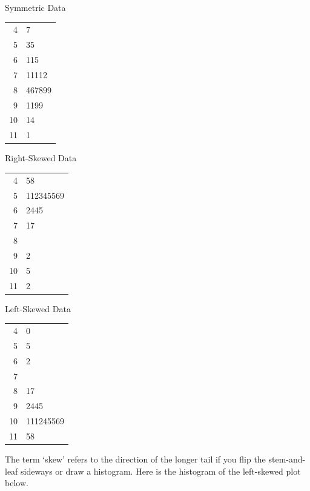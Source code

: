 \documentclass[11pt, chapterprefix=true]{scrbook}\usepackage[]{graphicx}\usepackage[]{color}
\begin{document}
\begin{minipage}[ht]{5cm}

Symmetric Data



\begin{tabular}{@{} r|l @{}} \hline
4 & 7 \\
5 & 35 \\
6 & 115 \\
7 & 11112 \\
8 & 467899 \\
9 & 1199 \\
10 & 14 \\
11 & 1 \\ \hline
\end{tabular}
\end{minipage}
\begin{minipage}[ht]{5cm}

Right-Skewed Data



\begin{tabular}{@{} r|l @{}} \hline
4 & 58 \\
5 & 112345569 \\
6 & 2445 \\
7 & 17 \\
8 & \\
9 & 2 \\
10 & 5 \\
11 & 2 \\ \hline
\end{tabular}
\end{minipage}
\begin{minipage}[ht]{5cm}

Left-Skewed Data




\begin{tabular}{@{} r|l} \hline
4 & 0 \\
5 & 5 \\
6 & 2 \\
7 & \\
8 & 17 \\
9 & 2445 \\
10 & 111245569 \\
11 & 58 \\ \hline
\end{tabular}
\end{minipage}

The term `skew' refers to the direction of the longer tail if you flip the stem-and-leaf sideways or draw a histogram.  Here is the histogram of the left-skewed plot below.
\end{document}
